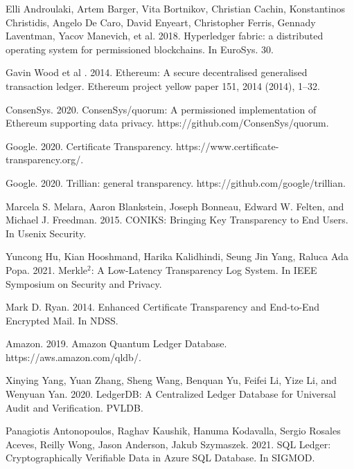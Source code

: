 \documentclass[11pt,dvipdfm]{article}
\begin{document}
\label{sec:conclusion}

\begin{thebibliography}{10}
\itemsep=1pt
\begin{small}

 Elli Androulaki, Artem Barger, Vita Bortnikov, Christian Cachin, Konstantinos Christidis, Angelo De Caro, David Enyeart, Christopher Ferris, Gennady Laventman, Yacov Manevich, et al. 2018. Hyperledger fabric: a distributed operating system for permissioned blockchains. In EuroSys. 30.

 Gavin Wood et al . 2014. Ethereum: A secure decentralised generalised transaction ledger. Ethereum project yellow paper 151, 2014 (2014), 1–32.

 ConsenSys. 2020. ConsenSys/quorum: A permissioned implementation of Ethereum supporting data privacy. https://github.com/ConsenSys/quorum.

 Google. 2020. Certificate Transparency. https://www.certificate-transparency.org/.

 Google. 2020. Trillian: general transparency. https://github.com/google/trillian.

 Marcela S. Melara, Aaron Blankstein, Joseph Bonneau, Edward W. Felten, and Michael J. Freedman. 2015. CONIKS: Bringing Key Transparency to End Users. In Usenix Security.

 Yuncong Hu, Kian Hooshmand, Harika Kalidhindi, Seung Jin Yang, Raluca Ada Popa. 2021. Merkle$^2$: A Low-Latency Transparency Log System. In IEEE Symposium on Security and Privacy.

 Mark D. Ryan. 2014. Enhanced Certificate Transparency and End-to-End Encrypted Mail. In NDSS.

 Amazon. 2019. Amazon Quantum Ledger Database. https://aws.amazon.com/qldb/.

 Xinying Yang, Yuan Zhang, Sheng Wang, Benquan Yu, Feifei Li, Yize Li, and Wenyuan Yan. 2020. LedgerDB: A Centralized Ledger Database for Universal Audit and Verification. PVLDB.

 Panagiotis Antonopoulos, Raghav Kaushik, Hanuma Kodavalla, Sergio Rosales Aceves, Reilly Wong, Jason Anderson, Jakub Szymaszek. 2021. SQL Ledger: Cryptographically Verifiable Data in Azure SQL Database. In SIGMOD.



\end{small}
\end{thebibliography}
\end{document}
